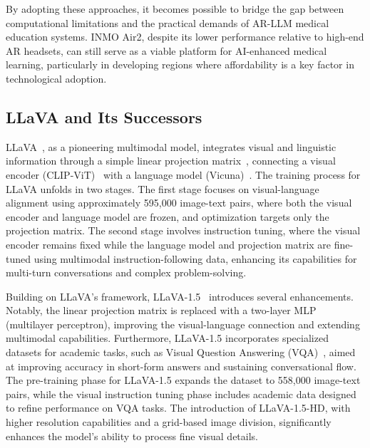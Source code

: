 \documentclass[10pt,letterpaper]{article}
\begin{document}
By adopting these approaches, it becomes possible to bridge the gap between computational limitations and the practical demands of AR-LLM medical education systems. INMO Air2, despite its lower performance relative to high-end AR headsets, can still serve as a viable platform for AI-enhanced medical learning, particularly in developing regions where affordability is a key factor in technological adoption.


\subsection*{LLaVA and Its Successors}

LLaVA~\cite{liu2023llava}, as a pioneering multimodal model, integrates visual and linguistic information through a simple linear projection matrix~\cite{chen2023politeflamingo}, connecting a visual encoder (CLIP-ViT)~\cite{radford2021learning, dosovitskiy2020image} with a language model (Vicuna)~\cite{vicuna2023}. The training process for LLaVA unfolds in two stages. The first stage focuses on visual-language alignment using approximately 595,000 image-text pairs, where both the visual encoder and language model are frozen, and optimization targets only the projection matrix. The second stage involves instruction tuning, where the visual encoder remains fixed while the language model and projection matrix are fine-tuned using multimodal instruction-following data, enhancing its capabilities for multi-turn conversations and complex problem-solving.

Building on LLaVA's framework, LLaVA-1.5~\cite{liu2023improvedllava} introduces several enhancements. Notably, the linear projection matrix is replaced with a two-layer MLP (multilayer perceptron), improving the visual-language connection and extending multimodal capabilities. Furthermore, LLaVA-1.5 incorporates specialized datasets for academic tasks, such as Visual Question Answering (VQA)~\cite{liu2023q2atransformer}, aimed at improving accuracy in short-form answers and sustaining conversational flow. The pre-training phase for LLaVA-1.5 expands the dataset to 558,000 image-text pairs, while the visual instruction tuning phase includes academic data designed to refine performance on VQA tasks. The introduction of LLaVA-1.5-HD, with higher resolution capabilities and a grid-based image division, significantly enhances the model's ability to process fine visual details.
\end{document}

